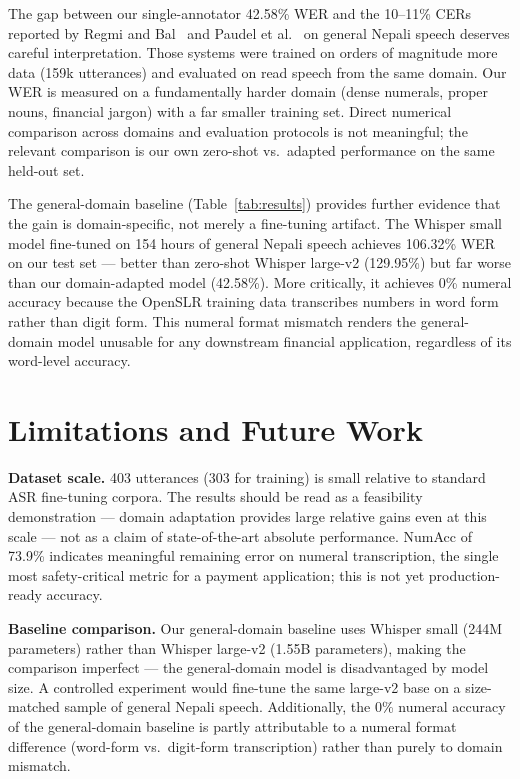 \documentclass[11pt,a4paper]{article}
\begin{document}
The gap between our single-annotator 42.58\% WER and the 10--11\% CERs
reported by Regmi and Bal~\cite{regmi2021} and Paudel et
al.~\cite{paudel2023} on general Nepali speech deserves careful
interpretation. Those systems were trained on orders of magnitude more data
(159k utterances) and evaluated on read speech from the same domain. Our
WER is measured on a fundamentally harder domain (dense numerals, proper
nouns, financial jargon) with a far smaller training set. Direct numerical
comparison across domains and evaluation protocols is not meaningful; the
relevant comparison is our own zero-shot vs.\ adapted performance on the
same held-out set.

The general-domain baseline (Table~\ref{tab:results}) provides further
evidence that the gain is domain-specific, not merely a fine-tuning
artifact. The Whisper small model fine-tuned on 154 hours of general
Nepali speech achieves 106.32\% WER on our test set --- better than
zero-shot Whisper large-v2 (129.95\%) but far worse than our
domain-adapted model (42.58\%). More critically, it achieves 0\%
numeral accuracy because the OpenSLR training data transcribes numbers
in word form rather than digit form. This numeral format mismatch
renders the general-domain model unusable for any downstream financial
application, regardless of its word-level accuracy.

\section{Limitations and Future Work}
\label{sec:limitations}

\textbf{Dataset scale.} 403 utterances (303 for training) is small relative
to standard ASR fine-tuning corpora. The results should be read as a
feasibility demonstration --- domain adaptation provides large relative
gains even at this scale --- not as a claim of state-of-the-art absolute
performance. NumAcc of 73.9\% indicates meaningful remaining error on
numeral transcription, the single most safety-critical metric for a
payment application; this is not yet production-ready accuracy.

\textbf{Baseline comparison.} Our general-domain baseline uses Whisper
small (244M parameters) rather than Whisper large-v2 (1.55B parameters),
making the comparison imperfect --- the general-domain model is
disadvantaged by model size. A controlled experiment would fine-tune the
same large-v2 base on a size-matched sample of general Nepali speech.
Additionally, the 0\% numeral accuracy of the general-domain baseline is
partly attributable to a numeral format difference (word-form vs.\
digit-form transcription) rather than purely to domain mismatch.
\end{document}

